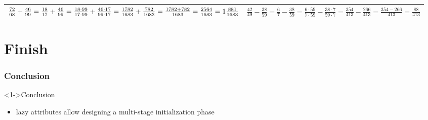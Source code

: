 \documentclass[ngerman,xcolor={table,dvipsnames},smaller,compress,hyperref={bookmarks,colorlinks}]{beamer}
\begin{document}
\begin{frame}[t,fragile]
\begin{block}
\begin{longtable}[l]{p{5cm}|p{5cm}}
$ \frac{72}{68} + \frac{46}{99} = \frac{18}{17} + \frac{46}{99} = \frac{18 \cdot 99}{17 \cdot 99} + \frac{46 \cdot 17}{99 \cdot 17} = \frac{1782}{1683} + \frac{782}{1683} = \frac{1782 + 782}{1683} = \frac{2564}{1683} = \normalsize{1} \frac{881}{1683} $ & $ \frac{42}{49} - \frac{38}{59} = \frac{6}{7} - \frac{38}{59} = \frac{6 \cdot 59}{7 \cdot 59} - \frac{38 \cdot 7}{59 \cdot 7} = \frac{354}{413} - \frac{266}{413} = \frac{354 - 266}{413} = \frac{88}{413} $                                              \\
\bottomrule
\end{longtable}

\end{block}

\end{frame}

\part{Finish}

\section{Conclusion}

\begin{frame}[t,fragile]

\begin{block}<1->{Conclusion}
\begin{itemize}
\item lazy attributes allow designing a multi-stage initialization phase
\begin{itemize}
\end{itemize}
\end{itemize}
\end{block}

\end{frame}
\end{document}
